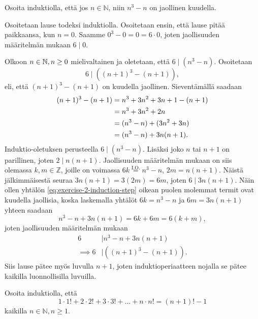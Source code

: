 \documentclass[11pt,a4paper]{amsart}
\begin{document}
\begin{exercise}
  Osoita induktiolla, että jos \(n \in \mathbb{N}\), niin \(n^3 - n\)
  on jaollinen kuudella.
\end{exercise}
\begin{solution}
  Osoitetaan lause todeksi induktiolla. Osoitetaan ensin, että lause pitää
  paikkaansa, kun \(n = 0\). Saamme \(0^3 - 0 = 0 = 6\cdot0\), joten
  jaollisuuden määritelmän mukaan \(6 \mid 0\).

  Olkoon \(n \in \mathbb{N}, n \geq 0\) mielivaltainen ja oletetaan, että
  \(6 \mid (n^3 - n)\).
  Osoitetaan
  \[
    6 \mid \left((n + 1)^3 - (n + 1)\right),
  \]
  eli, että \((n + 1)^3 - (n + 1)\) on kuudella jaollinen. Sieventämällä saadaan
  \begin{align}
    (n + 1)^3 - (n + 1) &= n^3 + 3n^2 + 3n + 1 - (n + 1) \notag \\
    &= n^3 + 3n^2 + 2n \notag \\
    &= (n^3 - n) + (3n^2 + 3n) \notag \\
    &= (n^3 - n) + 3n(n + 1). \label{eq:exercise-2-induction-step}
  \end{align}
  Induktio-oletuksen perusteella \(6 \mid (n^3 - n)\). Lisäksi joko \(n\) tai
  \(n + 1\) on parillinen, joten \(2 \mid n(n + 1)\). Jaollisuuden
  määritelmän mukaan on siis olemassa
  \(k,m \in \mathbb{Z}\), joille on voimassa
  \(6k \overset{\text{I.O.}}{=} n^3 - n\), \(2m = n(n + 1)\).
  Näistä jälkimmäisestä seuraa \(3n(n + 1) = 3(2m) = 6m\), joten \(6
  \mid 3n(n + 1)\).
  Näin ollen yhtälön \eqref{eq:exercise-2-induction-step} oikean puolen
  molemmat termit ovat kuudella jaollisia, koska
  laskemalla yhtälöt \(6k = n^3 - n\) ja \(6m = 3n(n + 1)\) yhteen
  saadaan
  \[
    n^3 - n + 3n(n + 1) = 6k + 6m = 6(k + m),
  \]
  joten jaollisuuden määritelmän mukaan
  \begin{align}
    6 & \mid n^3 - n + 3n(n + 1) \\
    \implies
    6 & \mid \left((n + 1)^3 - (n + 1)\right).
  \end{align}
  Siis lause pätee myös luvulla \(n + 1\), joten induktioperiaatteen
  nojalla se pätee kaikilla luonnollisilla luvuilla.
\end{solution}

\begin{exercise}
  Osoita induktiolla, että
  \[
    1 \cdot 1! + 2 \cdot 2! + 3 \cdot 3! + \dots + n \cdot n! = (n + 1)! - 1
  \]
  kaikilla \(n \in \mathbb{N}, n \geq 1\).
\end{exercise}
\end{document}
